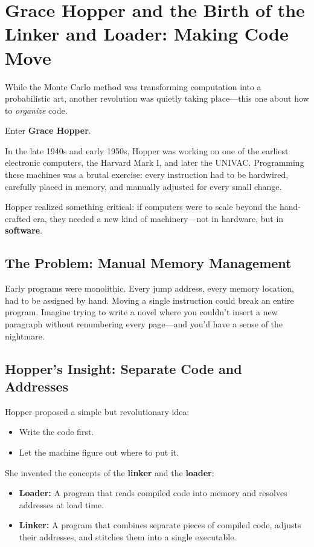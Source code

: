 \section{Grace Hopper and the Birth of the Linker and Loader: Making Code Move}

While the Monte Carlo method was transforming computation into a probabilistic art, another revolution was quietly taking place—this one about how to \textit{organize} code.

Enter \textbf{Grace Hopper}.

In the late 1940s and early 1950s, Hopper was working on one of the earliest electronic computers, the Harvard Mark I, and later the UNIVAC. Programming these machines was a brutal exercise: every instruction had to be hardwired, carefully placed in memory, and manually adjusted for every small change.

Hopper realized something critical: if computers were to scale beyond the hand-crafted era, they needed a new kind of machinery—not in hardware, but in \textbf{software}.

\subsection{The Problem: Manual Memory Management}

Early programs were monolithic. Every jump address, every memory location, had to be assigned by hand. Moving a single instruction could break an entire program. Imagine trying to write a novel where you couldn't insert a new paragraph without renumbering every page—and you'd have a sense of the nightmare.

\subsection{Hopper’s Insight: Separate Code and Addresses}

Hopper proposed a simple but revolutionary idea:

\begin{itemize} \item Write the code first. \item Let the machine figure out where to put it. \end{itemize}

She invented the concepts of the \textbf{linker} and the \textbf{loader}:

\begin{itemize} \item \textbf{Loader:} A program that reads compiled code into memory and resolves addresses at load time. \item \textbf{Linker:} A program that combines separate pieces of compiled code, adjusts their addresses, and stitches them into a single executable. \end{itemize}

